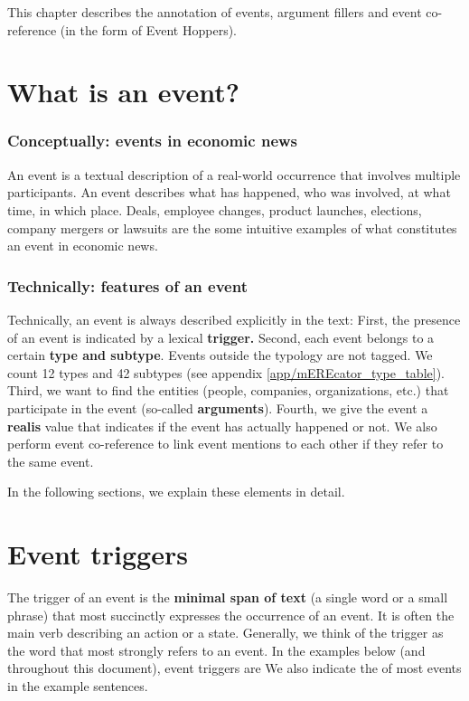 
This chapter describes the annotation of events, argument fillers and event co-reference (in the form of Event Hoppers).

\section{What is an event?}

\subsubsection{Conceptually: events in economic news}

An event is a textual description of a real-world occurrence that involves multiple participants.
An event describes what has happened, who was involved, at what time, in which place.
Deals, employee changes, product launches, elections, company mergers or lawsuits are the some intuitive examples of what constitutes an event in economic news. 

\subsubsection{Technically: features of an event}

Technically, an event is always described explicitly in the text:
First, the presence of an event is indicated by a lexical \textbf{trigger.}
Second, each event belongs to a certain \textbf{type and subtype}.
Events outside the typology are not tagged.
We count 12 types and 42 subtypes (see appendix \ref{app/mEREcator_type_table}). 
Third, we want to find the entities (people, companies, organizations, etc.) that participate in the event (so-called \textbf{arguments}).
Fourth, we give the event a \textbf{realis} value that indicates if the event has actually happened or not.
We also perform event co-reference to link event mentions to each other if they refer to the same event.

In the following sections, we explain these elements in detail.

\section{Event triggers}

The trigger of an event is the \textbf{minimal span of text} (a single word or a small phrase) that most succinctly expresses the occurrence of an event.
It is often the main verb describing an action or a state.
Generally, we think of the trigger as the word that most strongly refers to an event.
In the examples below (and throughout this document), event triggers are 
We also indicate the  of most events in the example sentences.

